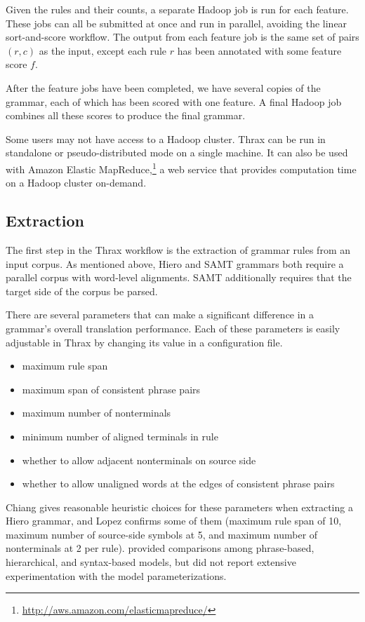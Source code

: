 \documentclass[11pt]{article}
\begin{document}
Given the rules and their counts, a separate Hadoop job is run for each feature. These jobs can all be submitted at once and run in parallel, avoiding the linear sort-and-score workflow. The output from each feature job is the same set of pairs $(r,c)$ as the input, except each rule $r$ has been annotated with some feature score $f$.

After the feature jobs have been completed, we have several copies of
the grammar, each of which has been scored with one feature.  A final Hadoop job combines all these scores to produce the final grammar.

Some users may not have access to a Hadoop cluster. Thrax can be run in standalone or pseudo-distributed mode on a single machine. It can also be used with Amazon Elastic MapReduce,\footnote{\url{http://aws.amazon.com/elasticmapreduce/}} a web service that provides computation time on a Hadoop cluster on-demand.

\subsection{Extraction}

The first step in the Thrax workflow is the extraction of grammar rules from an input corpus. As mentioned above, Hiero and SAMT grammars both require a parallel corpus with word-level alignments. SAMT additionally requires that the target side of the corpus be parsed.

There are several parameters that can make a significant difference in a grammar's overall translation performance. Each of these parameters is easily adjustable in Thrax by changing its value in a configuration file.

\begin{itemize}
\item maximum rule span
\item maximum span of consistent phrase pairs
\item maximum number of nonterminals
\item minimum number of aligned terminals in rule
\item whether to allow adjacent nonterminals on source side
\item whether to allow unaligned words at the edges of consistent phrase pairs
\end{itemize}

Chiang  gives reasonable heuristic choices for
these parameters when extracting a Hiero grammar, and Lopez
 confirms some of them (maximum rule span of 10,
maximum number of source-side symbols at 5, and maximum number of
nonterminals at 2 per rule).  provided
comparisons among phrase-based, hierarchical, and syntax-based models,
but did not report extensive experimentation with the model
parameterizations.
\end{document}
